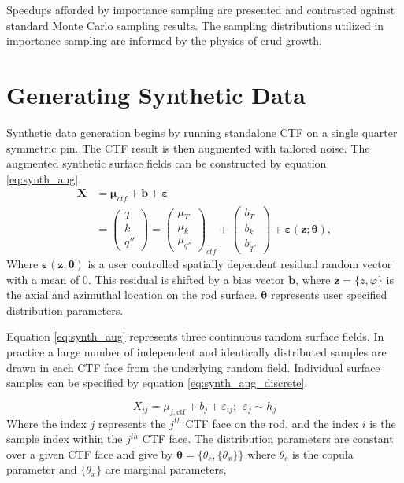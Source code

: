 Speedups afforded by importance sampling are presented and contrasted against standard Monte Carlo sampling results.  The sampling distributions utilized in importance sampling are informed by the physics of crud growth.

\section{Generating Synthetic Data}

Synthetic data generation begins by running standalone CTF on a single quarter symmetric pin.   The CTF result is then augmented with tailored noise.  The augmented synthetic surface fields can be constructed by equation \ref{eq:synth_aug}.
\begin{align}
    \bm X &= \bm \mu_{ctf} + \bm b + \bm \varepsilon \nonumber \\
          &=
    \begin{pmatrix}
        T \\
        k \\
        q''
    \end{pmatrix}
    =
    \begin{pmatrix}
        \mu_{T} \\
        \mu_k \\
        \mu_{q''}
    \end{pmatrix}_{ctf}
    + \begin{pmatrix}
        b_{T} \\
        b_k \\
        b_{q''}
    \end{pmatrix}
    + \bm{\varepsilon} (\mathbf z; \bm \theta),
\label{eq:synth_aug}
\end{align}
Where $\bm \varepsilon(\mathbf z, \bm \theta)$ is a user controlled spatially dependent residual random vector with a mean of 0.  This residual is
shifted by a bias vector
$\mathbf b$, where $\mathbf z=\{z, \varphi\}$ is the axial and azimuthal location on the rod surface.
$\bm \theta$ represents user specified distribution parameters.

Equation \ref{eq:synth_aug} represents three continuous random surface fields.  In practice a large number of independent and identically distributed samples are drawn in each CTF face from the underlying random field.  Individual surface samples can be specified by equation \ref{eq:synth_aug_discrete}.

\begin{equation}
    X_{ij} = \mu_{j,\mathrm{ctf}} + b_j + \varepsilon_{ij};\ \   \varepsilon_{j} \sim h_j
    \label{eq:synth_aug_discrete}
\end{equation}
Where the index $j$ represents the $j^{th}$ CTF face on the rod, and the index $i$ is the sample index within the $j^{th}$ CTF face.  The distribution parameters are constant over a given CTF face and give by $\bm \theta = \{\theta_c, \{\theta_x\}\}$ where $\theta_c$ is the copula parameter and  $\{\theta_x\}$ are marginal parameters, 


